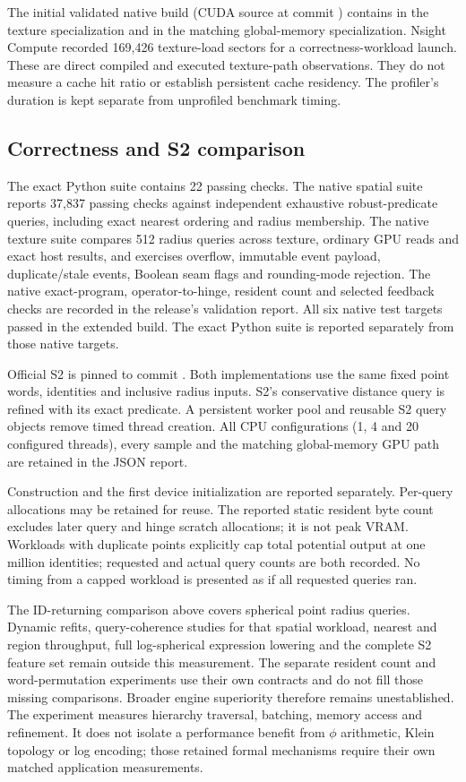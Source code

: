 The initial validated native build (CUDA source at commit )
contains  in the texture
specialization and  in the matching global-memory specialization.
Nsight Compute recorded 169,426 texture-load sectors for a correctness-workload
launch. These are direct compiled and executed texture-path observations.
They do not measure a cache hit ratio or establish persistent cache residency.
The profiler's duration is kept separate from unprofiled benchmark timing.

\subsection{Correctness and S2 comparison}
The exact Python suite contains 22 passing checks. The native spatial suite
reports 37,837 passing checks against independent exhaustive robust-predicate
queries, including exact nearest ordering and radius membership. The native
texture suite compares 512 radius queries across texture, ordinary GPU reads
and exact host results, and exercises overflow, immutable event payload,
duplicate/stale events, Boolean seam flags and rounding-mode rejection.
The native exact-program, operator-to-hinge, resident count and selected
feedback checks are recorded in the release's validation report. All six
native test targets passed in the extended build. The exact Python suite is
reported separately from those native targets.

Official S2 is pinned to commit
. Both implementations use
the same fixed point words, identities and inclusive radius inputs. S2's
conservative distance query is refined with its exact predicate. A persistent
worker pool and reusable S2 query objects remove timed thread creation.
All CPU configurations (1, 4 and 20 configured threads), every sample and the
matching global-memory GPU path are retained in the JSON report.



Construction and the first device initialization are reported separately.
Per-query allocations may be retained for reuse. The reported static resident
byte count excludes later query and hinge scratch allocations; it is not peak
VRAM. Workloads with duplicate points explicitly cap total potential output
at one million identities; requested and actual query counts are both recorded.
No timing from a capped workload is presented as if all requested queries ran.

The ID-returning comparison above covers spherical point radius queries.
Dynamic refits, query-coherence studies for that spatial workload, nearest
and region throughput, full
log-spherical expression lowering and the complete S2 feature set remain
outside this measurement. The separate resident count and word-permutation
experiments use their own contracts and do not fill those missing comparisons.
Broader engine superiority therefore remains unestablished.
The experiment measures hierarchy traversal, batching, memory access and
refinement. It does not isolate a performance benefit from $\phi$ arithmetic,
Klein topology or log encoding; those retained formal mechanisms require
their own matched application measurements.
